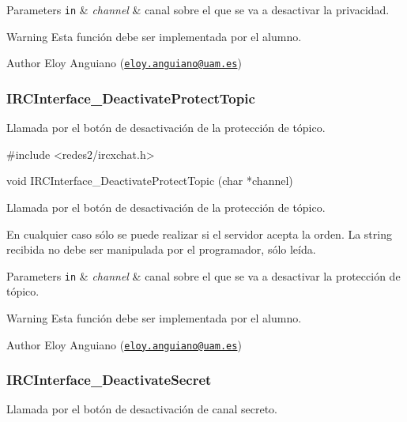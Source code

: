 \begin{DoxyParams}[1]{Parameters}
\mbox{\tt in}  & {\em channel} & canal sobre el que se va a desactivar la privacidad.\\
\hline
\end{DoxyParams}
\begin{DoxyWarning}{Warning}
Esta función debe ser implementada por el alumno.
\end{DoxyWarning}
\begin{DoxyAuthor}{Author}
Eloy Anguiano (\href{mailto:eloy.anguiano@uam.es}{\tt eloy.\+anguiano@uam.\+es})
\end{DoxyAuthor}


 \hypertarget{IRCInterface_DeactivateProtectTopic}{}\subsubsection{I\+R\+C\+Interface\+\_\+\+Deactivate\+Protect\+Topic}\label{IRCInterface_DeactivateProtectTopic}
Llamada por el botón de desactivación de la protección de tópico.


\begin{DoxyCode}
\textcolor{preprocessor}{#include <redes2/ircxchat.h>}

\textcolor{keywordtype}{void} IRCInterface\_DeactivateProtectTopic (\textcolor{keywordtype}{char} *channel)
\end{DoxyCode}


Llamada por el botón de desactivación de la protección de tópico.

En cualquier caso sólo se puede realizar si el servidor acepta la orden. La string recibida no debe ser manipulada por el programador, sólo leída.


\begin{DoxyParams}[1]{Parameters}
\mbox{\tt in}  & {\em channel} & canal sobre el que se va a desactivar la protección de tópico.\\
\hline
\end{DoxyParams}
\begin{DoxyWarning}{Warning}
Esta función debe ser implementada por el alumno.
\end{DoxyWarning}
\begin{DoxyAuthor}{Author}
Eloy Anguiano (\href{mailto:eloy.anguiano@uam.es}{\tt eloy.\+anguiano@uam.\+es})
\end{DoxyAuthor}


 \hypertarget{IRCInterface_DeactivateSecret}{}\subsubsection{I\+R\+C\+Interface\+\_\+\+Deactivate\+Secret}\label{IRCInterface_DeactivateSecret}
Llamada por el botón de desactivación de canal secreto.


